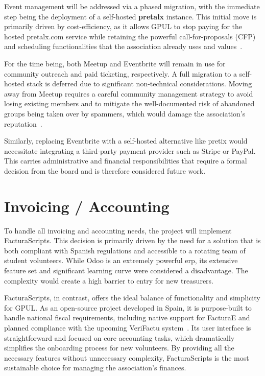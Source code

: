 Event management will be addressed via a phased migration, with the immediate step being the deployment of a self-hosted \textbf{pretalx} instance. This initial move is primarily driven by cost-efficiency, as it allows GPUL to stop paying for the hosted pretalx.com service while retaining the powerful call-for-proposals (CFP) and scheduling functionalities that the association already uses and values~\cite{pretalx-docs}.

For the time being, both Meetup and Eventbrite will remain in use for community outreach and paid ticketing, respectively. A full migration to a self-hosted stack is deferred due to significant non-technical considerations. Moving away from Meetup requires a careful community management strategy to avoid losing existing members and to mitigate the well-documented risk of abandoned groups being taken over by spammers, which would damage the association's reputation~\cite{combuilders-meetup-takeover}.

Similarly, replacing Eventbrite with a self-hosted alternative like pretix would necessitate integrating a third-party payment provider such as Stripe or PayPal. This carries administrative and financial responsibilities that require a formal decision from the board and is therefore considered future work.

\section{Invoicing / Accounting}

To handle all invoicing and accounting needs, the project will implement FacturaScripts. This decision is primarily driven by the need for a solution that is both compliant with Spanish regulations and accessible to a rotating team of student volunteers. While Odoo is an extremely powerful \gls{erp}, its extensive feature set and significant learning curve were considered a disadvantage. The complexity would create a high barrier to entry for new treasurers.

FacturaScripts, in contrast, offers the ideal balance of functionality and simplicity for GPUL. As an open-source project developed in Spain, it is purpose-built to handle national fiscal requirements, including native support for FacturaE and planned compliance with the upcoming VeriFactu system~\cite{facturascripts-antifraude}. Its user interface is straightforward and focused on core accounting tasks, which dramatically simplifies the onboarding process for new volunteers. By providing all the necessary features without unnecessary complexity, FacturaScripts is the most sustainable choice for managing the association's finances.

